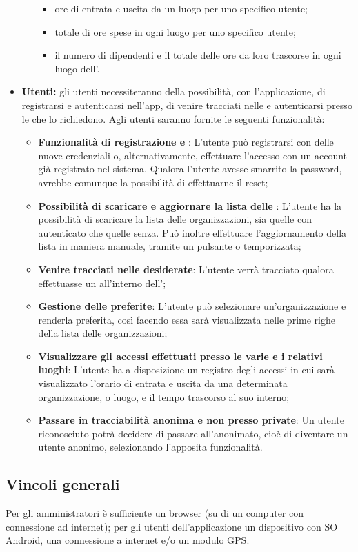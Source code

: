 \begin{itemize}
\begin{itemize}
            \begin{itemize}
                \item ore di entrata e uscita da un luogo per uno specifico utente;
                \item totale di ore spese in ogni luogo per uno specifico utente;
                \item il numero di dipendenti e il totale delle ore da loro trascorse in ogni luogo dell'.
            \end{itemize}
        \end{itemize}
    \item \textbf{Utenti:} gli utenti necessiteranno della possibilità, con l'applicazione, di registrarsi e autenticarsi nell'app, di venire tracciati nelle  e autenticarsi presso le  che lo richiedono. Agli utenti saranno fornite le seguenti funzionalità:
    \begin{itemize}
        \item \textbf{Funzionalità di registrazione e }: L'utente può registrarsi con delle nuove credenziali o, alternativamente, effettuare l'accesso con un account già registrato nel sistema. Qualora l'utente avesse smarrito la password, avrebbe comunque la possibilità di effettuarne il reset;
        \item \textbf{Possibilità di scaricare e aggiornare la lista delle }: L'utente ha la possibilità di scaricare la lista delle organizzazioni, sia quelle con  autenticato che quelle senza. Può inoltre effettuare l'aggiornamento della lista in maniera manuale, tramite un pulsante o temporizzata;
        \item \textbf{Venire tracciati nelle  desiderate}: L'utente verrà tracciato qualora effettuasse un  all'interno dell';
        \item \textbf{Gestione delle  preferite}: L'utente può selezionare un'organizzazione e renderla preferita, così facendo essa sarà visualizzata nelle prime righe della lista delle organizzazioni;
        \item \textbf{Visualizzare gli accessi effettuati presso le varie  e i relativi luoghi}: L'utente ha a disposizione un registro degli accessi in cui sarà visualizzato l'orario di entrata e uscita da una determinata organizzazione, o luogo, e il tempo trascorso al suo interno;
        \item \textbf{Passare in tracciabilità anonima e non presso  private}: Un utente riconosciuto potrà decidere di passare all'anonimato, cioè di diventare un utente anonimo, selezionando l'apposita funzionalità.
    \end{itemize}
\end{itemize}
\subsection{Vincoli generali}
Per gli amministratori è sufficiente un browser (su di un computer con connessione ad internet); per gli utenti dell'applicazione un dispositivo con SO Android, una connessione a internet e/o un modulo GPS.